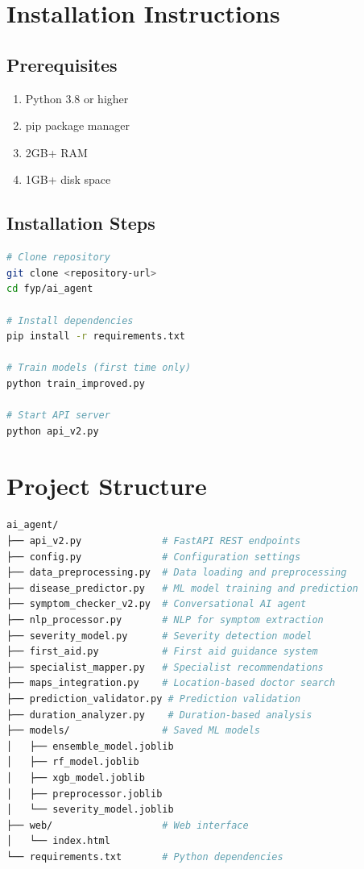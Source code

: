 \section{Installation Instructions}
\subsection{Prerequisites}
\begin{enumerate}
    \item Python 3.8 or higher
    \item pip package manager
    \item 2GB+ RAM
    \item 1GB+ disk space
\end{enumerate}

\subsection{Installation Steps}
\begin{lstlisting}[language=bash, caption=Installation Commands]
# Clone repository
git clone <repository-url>
cd fyp/ai_agent

# Install dependencies
pip install -r requirements.txt

# Train models (first time only)
python train_improved.py

# Start API server
python api_v2.py
\end{lstlisting}

\section{Project Structure}
\begin{lstlisting}[language=bash, caption=Project Directory Structure]
ai_agent/
├── api_v2.py              # FastAPI REST endpoints
├── config.py              # Configuration settings
├── data_preprocessing.py  # Data loading and preprocessing
├── disease_predictor.py   # ML model training and prediction
├── symptom_checker_v2.py  # Conversational AI agent
├── nlp_processor.py       # NLP for symptom extraction
├── severity_model.py      # Severity detection model
├── first_aid.py           # First aid guidance system
├── specialist_mapper.py   # Specialist recommendations
├── maps_integration.py    # Location-based doctor search
├── prediction_validator.py # Prediction validation
├── duration_analyzer.py    # Duration-based analysis
├── models/                # Saved ML models
│   ├── ensemble_model.joblib
│   ├── rf_model.joblib
│   ├── xgb_model.joblib
│   ├── preprocessor.joblib
│   └── severity_model.joblib
├── web/                   # Web interface
│   └── index.html
└── requirements.txt       # Python dependencies
\end{lstlisting}

